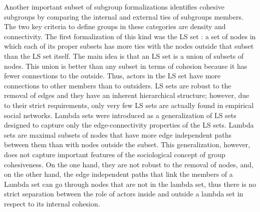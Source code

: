 Another important subset of subgroup formalizations identifies cohesive subgroups by comparing the internal and external ties of subgroups members. The two key criteria to define groups in these categories are density and connectivity. The first formalization of this kind was the LS set \citep{luccio:1969,lawler:1973}: a set of nodes in which each of its proper subsets has more ties with the nodes outside that subset than the LS set itself. The main idea is that an LS set is a union of subsets of nodes. This union is better than any subset in terms of cohesion because it has fewer connections to the outside. Thus, actors in the LS set have more connections to other members than to outsiders. LS sets are robust to the removal of edges and they have an inherent hierarchical structure; however, due to their strict requirements, only very few LS sets are actually found in empirical social networks. Lambda sets \citep{borgatti:1990} were introduced as a generalization of LS sets designed to capture only the edge-connectivity properties of the LS sets. Lambda sets are maximal subsets of nodes that have more edge independent paths between them than with nodes outside the subset. This generalization, however, does not capture important features of the sociological concept of group cohesiveness. On the one hand, they are not robust to the removal of nodes, and, on the other hand, the edge independent paths that link the members of a Lambda set can go through nodes that are not in the lambda set, thus there is no strict separation between the role of actors inside and outside a lambda set in respect to its internal cohesion. 

\begin{landscape}



\end{landscape}

